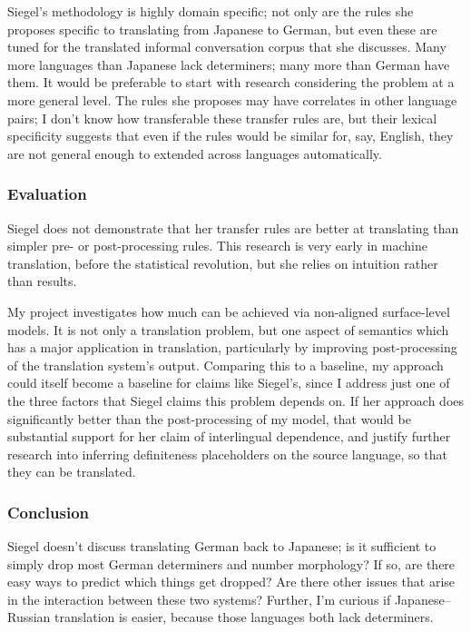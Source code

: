 \documentclass[11pt]{article}
\begin{document}

Siegel's methodology is highly domain specific; not only are the rules she proposes specific to translating from Japanese to German, but even these are tuned for the translated informal conversation corpus that she discusses.
Many more languages than Japanese lack determiners; many more than German have them. It would be preferable to start with research considering the problem at a more general level. The rules she proposes may have correlates in other language pairs; I don't know how transferable these transfer rules are, but their lexical specificity suggests that even if the rules would be similar for, say, English, they are not general enough to extended across languages automatically.

\subsubsection*{Evaluation}

Siegel does not demonstrate that her transfer rules are better at translating than simpler pre- or post-processing rules. This research is very early in machine translation, before the statistical revolution, but she relies on intuition rather than results.

My project investigates how much can be achieved via non-aligned surface-level models. It is not only a translation problem, but one aspect of semantics which has a major application in translation, particularly by improving post-processing of the translation system's output. Comparing this to a baseline, my approach could itself become a baseline for claims like Siegel's, since I address just one of the three factors that Siegel claims this problem depends on. If her approach does significantly better than the post-processing of my model, that would be substantial support for her claim of interlingual dependence, and justify further research into inferring definiteness placeholders on the source language, so that they can be translated.


\subsubsection*{Conclusion}

Siegel doesn't discuss translating German back to Japanese; is it sufficient to simply drop most German determiners and number morphology? If so, are there easy ways to predict which things get dropped? Are there other issues that arise in the interaction between these two systems? Further, I'm curious if Japanese--Russian translation is easier, because those languages both lack determiners.
\end{document}
